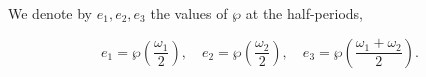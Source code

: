 We denote by $e_1, e_2, e_3$ the values of $\wp$ at the half-periods,

$$e_1 = \wp\left(\frac{\omega_1}{2}\right), \quad e_2 = \wp\left(\frac{\omega_2}{2}\right), \quad e_3 = \wp\left(\frac{\omega_1 + \omega_2}{2}\right).$$
